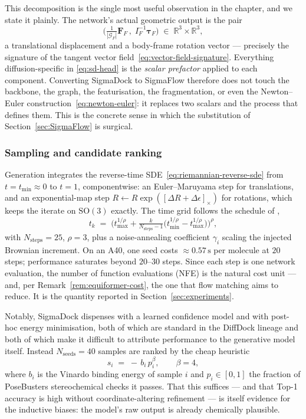 \documentclass[a4paper,12pt]{article}
\theoremstyle{remark}
\begin{document}
This decomposition is the single most useful observation in the chapter, and we state it plainly.
The network's actual geometric output is the pair
\begin{equation}
\label{eq:sd-raw-output}
  \Big( \tfrac{1}{|\mathcal{G}_F|}\mathbf{F}_F \,,\; I_F^{-1} \bm{\tau}_F \Big) \;\in\; \mathbb{R}^3 \times \mathbb{R}^3,
\end{equation}
a translational displacement and a body-frame rotation vector --- precisely the signature of the
tangent vector field~\eqref{eq:vector-field-signature}. Everything diffusion-specific in
\eqref{eq:sd-head} is the \emph{scalar prefactor} applied to each component. Converting SigmaDock to
SigmaFlow therefore does not touch the backbone, the graph, the featurisation, the fragmentation, or
even the Newton--Euler construction~\eqref{eq:newton-euler}: it replaces two scalars and the process
that defines them. This is the concrete sense in which the substitution of
Section~\ref{sec:SigmaFlow} is surgical.

\subsubsection{Sampling and candidate ranking}

Generation integrates the reverse-time SDE~\eqref{eq:riemannian-reverse-sde} from
$t = t_{\min} \approx 0$ to $t = 1$, componentwise: an Euler--Maruyama step for translations, and an
exponential-map step $R \leftarrow R \exp([\Delta R + \Delta\epsilon]_\times)$ for rotations, which
keeps the iterate on $\mathrm{SO}(3)$ exactly. The time grid follows the schedule of
\cite{bortoliRiemannianScoreBasedGenerative2022},
\[
  t_k \;=\; \Big( t_{\max}^{1/\rho} + \tfrac{k}{N_{\text{steps}}-1}\big(t_{\min}^{1/\rho} - t_{\max}^{1/\rho}\big) \Big)^{\rho},
\]
with $N_{\text{steps}} = 25$, $\rho = 3$, plus a noise-annealing coefficient $\gamma_i$ scaling the
injected Brownian increment. On an A40, one seed costs $\approx 0.57\,\mathrm{s}$ per molecule at
$20$ steps; performance saturates beyond $20$--$30$ steps. Since each step is one network evaluation,
the number of function evaluations (NFE) is the natural cost unit --- and, per
Remark~\ref{rem:equiformer-cost}, the one that flow matching aims to reduce. It is the quantity
reported in Section~\ref{sec:experiments}.

Notably, SigmaDock dispenses with a learned confidence model and with post-hoc energy minimisation,
both of which are standard in the DiffDock lineage and both of which make it difficult to attribute
performance to the generative model itself. Instead $N_{\text{seeds}} = 40$ samples are ranked by the
cheap heuristic
\[
  s_i \;=\; -\, b_i \, p_i^{\beta}, \qquad \beta = 4,
\]
where $b_i$ is the Vinardo binding energy of sample $i$ and $p_i \in [0,1]$ the fraction of
PoseBusters stereochemical checks it passes. That this suffices --- and that Top-1 accuracy is high
without coordinate-altering refinement --- is itself evidence for the inductive biases: the model's
raw output is already chemically plausible.
\end{document}
